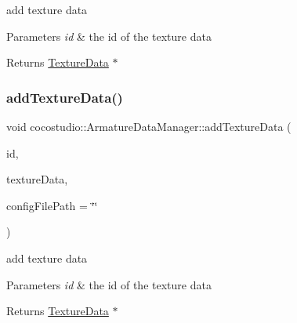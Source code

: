 add texture data 


\begin{DoxyParams}{Parameters}
{\em id} & the id of the texture data \\
\hline
\end{DoxyParams}
\begin{DoxyReturn}{Returns}
\hyperlink{classcocostudio_1_1TextureData}{Texture\+Data} $\ast$ 
\end{DoxyReturn}
\mbox{\label{classcocostudio_1_1ArmatureDataManager_aed885f4d9ab821f83f3a3826655e3325}} 
\subsubsection{\texorpdfstring{add\+Texture\+Data()}{addTextureData()}\hspace{0.1cm}{\footnotesize\ttfamily [2/2]}}
{\footnotesize\ttfamily void cocostudio\+::\+Armature\+Data\+Manager\+::add\+Texture\+Data (\begin{DoxyParamCaption}\item[{const std\+::string \&}]{id,  }\item[{\hyperlink{classcocostudio_1_1TextureData}{Texture\+Data} $\ast$}]{texture\+Data,  }\item[{const std\+::string \&}]{config\+File\+Path = {\ttfamily \char`\"{}\char`\"{}} }\end{DoxyParamCaption})}



add texture data 


\begin{DoxyParams}{Parameters}
{\em id} & the id of the texture data \\
\hline
\end{DoxyParams}
\begin{DoxyReturn}{Returns}
\hyperlink{classcocostudio_1_1TextureData}{Texture\+Data} $\ast$ 
\end{DoxyReturn}
\mbox{\label{classcocostudio_1_1ArmatureDataManager_a256a53756d5a9888f18d6474ff82c199}} 
